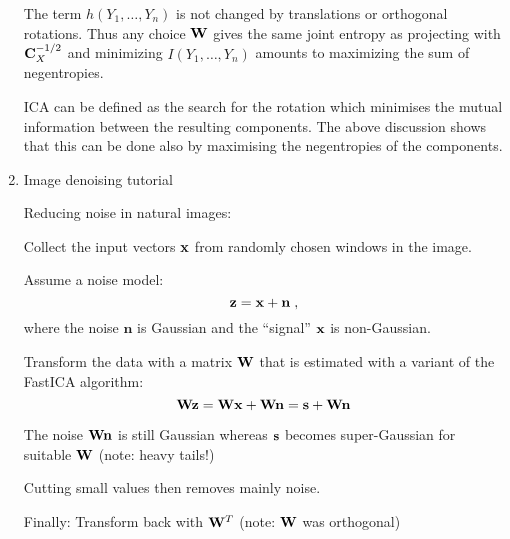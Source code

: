 \begin{enumerate}
\begin{solution}
    The term $h(Y_1, \ldots, Y_n)$ is not changed by translations or orthogonal rotations.
    Thus any choice ${ \bf W}$ gives the same joint entropy as projecting with ${\bf C}_X^{-1/2}$
    and minimizing $I(Y_1, \ldots, Y_n)$ amounts to maximizing the sum of negentropies.

    ICA can be defined as the search for the rotation which minimises
    the mutual information between the resulting components.  The above
    discussion shows that this can be done also by
    maximising the negentropies of the components.

  \end{solution}
  
\item Image denoising tutorial

  \begin{solution}

    Reducing noise in natural images:

    Collect the input vectors ${\bf x}$ from randomly chosen windows in the
    image.

    Assume a noise model:
    \begin{displaymath}
      {\bf z} = {\bf x} + \mathbf{n} \; ,
    \end{displaymath}
    where the noise $\mathbf{n}$ is Gaussian and the ``signal'' ${\bf x}$ is
    non-Gaussian.

    Transform the data with a matrix ${\bf W}$ that is estimated with a variant 
    of the FastICA algorithm:
    \begin{displaymath}
      {\bf Wz} = {\bf Wx} + {\bf Wn} = {\bf s} + {\bf Wn}
    \end{displaymath}

    The noise ${\bf Wn}$ is still Gaussian whereas ${\bf s}$ becomes
    super-Gaussian for suitable ${\bf W}$ (note: heavy tails!)

    Cutting small values then removes mainly noise.

    Finally: Transform back with ${\bf W}^T$ (note: ${\bf W}$ was orthogonal)

  \end{solution}

  

\end{enumerate}

